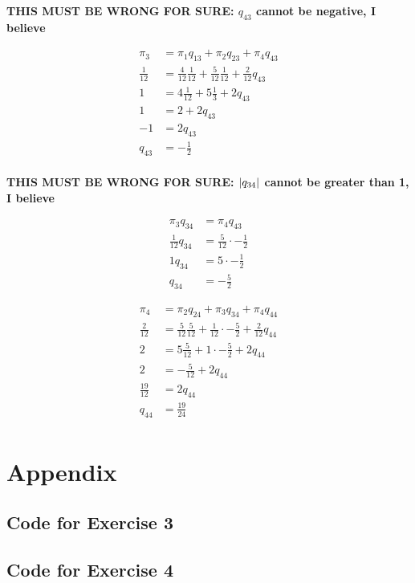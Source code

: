 \documentclass[12pt]{article}
\DeclarePairedDelimiter\abs{\lvert}{\rvert}
\begin{document}
\textbf{THIS MUST BE WRONG FOR SURE: $q_{43}$ cannot be negative, I believe}

\begin{align*}
	\pi_3 &= \pi_1 q_{13} + \pi_2 q_{23} + \pi_4 q_{43} \\
	\frac{1}{12} &= \frac{4}{12} \frac{1}{12} + \frac{5}{12} \frac{1}{12}+ \frac{2}{12} q_{43} \\
	1 &= 4 \frac{1}{12} + 5 \frac{1}{3} + 2 q_{43} \\
	1 &= 2 + 2 q_{43} \\
	-1 &= 2 q_{43} \\
	q_{43} &= -\frac{1}{2} \\
\end{align*}

\textbf{THIS MUST BE WRONG FOR SURE: $\abs{q_{34}}$ cannot be greater than 1, I believe}

\begin{align*}
	\pi_3 q_{34} &= \pi_4 q_{43} \\
	\frac{1}{12} q_{34} &= \frac{5}{12} \cdot -\frac{1}{2} \\
	1 q_{34} &= 5 \cdot -\frac{1}{2} \\
	q_{34} &= -\frac{5}{2}
\end{align*}

\begin{align*}
	\pi_4 &= \pi_2 q_{24} + \pi_3 q_{34} + \pi_4 q_{44} \\
	\frac{2}{12} &= \frac{5}{12} \frac{5}{12} + \frac{1}{12} \cdot -\frac{5}{2} + \frac{2}{12} q_{44} \\
	2 &= 5 \frac{5}{12} + 1 \cdot -\frac{5}{2} + 2 q_{44} \\
	2 &= -\frac{5}{12} + 2 q_{44} \\
	\frac{19}{12} &= 2 q_{44} \\
	q_{44} &= \frac{19}{24} \\
\end{align*}


\section*{Appendix}\label{appendix}
\subsection*{Code for Exercise 3}

\subsection*{Code for Exercise 4}

\end{document}
